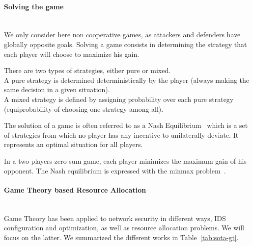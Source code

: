 \paragraph{Solving the game}\textbf{\\}
We only consider here non cooperative games, as attackers and defenders have globally opposite goals.
Solving a game consists in determining the strategy that each player will choose to maximize his gain.

There are two types of strategies, either pure or mixed.\\
A pure strategy is determined deterministically by the player (\ie always making the same decision in a given situation).\\
A mixed strategy is defined by assigning probability over each pure strategy (\eg equiprobability of choosing one strategy among all).

The solution of a game is often referred to as a Nash Equilibrium~\cite{nasheq} which is a set of strategies from which no player has any incentive to unilaterally deviate. It represents an optimal situation for all players.

In a two players zero sum game, each player minimizes the maximum gain of his opponent. 
The Nash equilibrium is expressed with the minmax problem~\cite{minmax}.

\paragraph{Game Theory based Resource Allocation}\textbf{\\}
Game Theory has been applied to network security in different ways, IDS configuration and optimization, as well as resource allocation problems. We will focus on the latter. We summarized the different works in Table~\ref{tab:sota-gt}.

